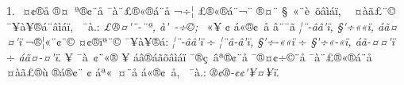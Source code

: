 \documentclass[12pt,twoside,a4paper]{article}
\begin{document}
1. ^^87 ^^a4^^a2^^ae^^e5 ^^ae^^a4^^ad^^a0^^aa^^ae^^a2^^a8^^e5 ^^af^^e0^^a8^^a3^^ae^^ab^^ae^^e1^^ad^^a8^^e5 ^^ac^^f7^^a6 ^^a3^^ae^^ab^^ae^^e1^^ad^^a8^^ac^^a8 ^^ae^^a4^^a8^^ad\linebreak
^^a7^^a0^^ab^^a8^^e8^^a0^^f5^^e2^^ec^^e1^^ef, ^^a0 ^^a4^^e0^^e3^^a3^^a8^^a9 ^^af^^a5^^e0^^a5^^ad^^ae^^e1^^a8^^e2^^ec^^e1^^ef, ^^ad^^a0^^af^^e0.: 
                                 \emph{^^a3^^ae^^a4\'^^a8^^ad-^^ad^^a8^^aa,\linebreak
^^e0\'^^a0^^ad-^^ad^^f7^^a9;} ^^a0^^ab^^a5 ^^a2 ^^e1^^ab^^ae^^a2^^a0^^e5 ^^e2^^a8^^af^^e3 
         \emph{^^a6^^a8-^^e2^^e2\'^^ef, ^^a7\'^^f7^^ab^^ab^^ef, ^^e1^^e3^^a4^^a4\'^^ef} ^^ac^^ae^^a6^^ab^^a8^^a2^^a8^^a9 \linebreak
^^a4^^a2^^ae^^ef^^aa^^a8^^a9 ^^af^^a5^^e0^^a5^^ad^^ae^^e1: \emph{^^a6^^a8-^^e2^^e2\'^^ef} ^^f7 \emph{^^a6^^a8^^e2-^^e2\'^^ef, 
               ^^a7\'^^f7-^^ab^^ab^^ef} ^^f7 \emph{^^a7\'^^f7^^ab-^^ab^^ef, ^^e1^^e3-^^a4^^a4\'^^ef}\linebreak 
^^f7 \emph{^^e1^^e3^^a4-^^a4\'^^ef}. 
      ^^96^^a5 ^^af^^e0^^a0^^a2^^a8^^ab^^ae ^^ad^^a5 ^^e1^^e2^^ae^^e1^^e3^^f5^^e2^^ec^^e1^^ef ^^af^^ae^^e7^^a0^^e2^^aa^^ae^^a2^^a8^^e5 ^^af^^ae^^a4^^a2^^f7^^a9^^ad^^a8^^e5 \linebreak
^^af^^e0^^a8^^a3^^ae^^ab^^ae^^e1^^ad^^a8^^e5 ^^a4^^e0^^e3^^a3^^ae^^f9 ^^ae^^e1^^ad^^ae^^a2^^a8 ^^a2 ^^e1^^aa^^ab^^a0^^a4^^ad^^a8^^e5 ^^e1^^ab^^ae^^a2^^a0^^e5, ^^ad^^a0^^af^^e0.:\linebreak
\emph{^^ad^^ae^^a2^^ae-^^a2^^a2\'^^a5^^a4^^a5^^ad^^ad^^ef}. 
\end{document}
